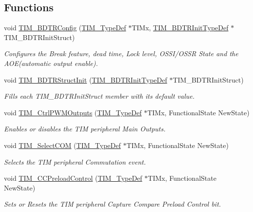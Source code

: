 \subsection*{Functions}
\begin{DoxyCompactItemize}
\item 
void \hyperlink{group___t_i_m___group4_ga3df4ba3f0727f63ce621e2b2e6035d4f}{T\+I\+M\+\_\+\+B\+D\+T\+R\+Config} (\hyperlink{struct_t_i_m___type_def}{T\+I\+M\+\_\+\+Type\+Def} $\ast$T\+I\+Mx, \hyperlink{struct_t_i_m___b_d_t_r_init_type_def}{T\+I\+M\+\_\+\+B\+D\+T\+R\+Init\+Type\+Def} $\ast$T\+I\+M\+\_\+\+B\+D\+T\+R\+Init\+Struct)
\begin{DoxyCompactList}\small\item\em Configures the Break feature, dead time, Lock level, O\+S\+S\+I/\+O\+S\+SR State and the A\+O\+E(automatic output enable). \end{DoxyCompactList}\item 
void \hyperlink{group___t_i_m___group4_gaea0f49938cda8ae0738162194798afc6}{T\+I\+M\+\_\+\+B\+D\+T\+R\+Struct\+Init} (\hyperlink{struct_t_i_m___b_d_t_r_init_type_def}{T\+I\+M\+\_\+\+B\+D\+T\+R\+Init\+Type\+Def} $\ast$T\+I\+M\+\_\+\+B\+D\+T\+R\+Init\+Struct)
\begin{DoxyCompactList}\small\item\em Fills each T\+I\+M\+\_\+\+B\+D\+T\+R\+Init\+Struct member with its default value. \end{DoxyCompactList}\item 
void \hyperlink{group___t_i_m___group4_ga3e59ebced2ab8e0b817c460f1670e97d}{T\+I\+M\+\_\+\+Ctrl\+P\+W\+M\+Outputs} (\hyperlink{struct_t_i_m___type_def}{T\+I\+M\+\_\+\+Type\+Def} $\ast$T\+I\+Mx, Functional\+State New\+State)
\begin{DoxyCompactList}\small\item\em Enables or disables the T\+IM peripheral Main Outputs. \end{DoxyCompactList}\item 
void \hyperlink{group___t_i_m___group4_gaff2e7f9959b1b36e830df028c14accc8}{T\+I\+M\+\_\+\+Select\+C\+OM} (\hyperlink{struct_t_i_m___type_def}{T\+I\+M\+\_\+\+Type\+Def} $\ast$T\+I\+Mx, Functional\+State New\+State)
\begin{DoxyCompactList}\small\item\em Selects the T\+IM peripheral Commutation event. \end{DoxyCompactList}\item 
void \hyperlink{group___t_i_m___group4_ga0a935254e44312b1d78e8684a58db3c1}{T\+I\+M\+\_\+\+C\+C\+Preload\+Control} (\hyperlink{struct_t_i_m___type_def}{T\+I\+M\+\_\+\+Type\+Def} $\ast$T\+I\+Mx, Functional\+State New\+State)
\begin{DoxyCompactList}\small\item\em Sets or Resets the T\+IM peripheral Capture Compare Preload Control bit. \end{DoxyCompactList}\end{DoxyCompactItemize}


